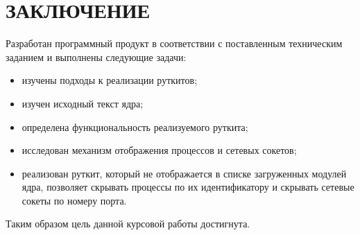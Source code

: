 \chapter*{\hfill{}ЗАКЛЮЧЕНИЕ\hfill{}}%
\label{cha:zakliuchenie}

Разработан программный продукт в соответствии с поставленным техническим заданием и выполнены следующие задачи:
\begin{itemize}
    \item
        изучены подходы к реализации руткитов;
    \item
        изучен исходный текст ядра;
    \item
        определена функциональность реализуемого руткита;
    \item
        исследован механизм отображения процессов и сетевых сокетов;
    \item
        реализован руткит, который не отображается в списке загруженных модулей ядра, позволяет скрывать процессы по их идентификатору и скрывать сетевые сокеты по номеру порта.
\end{itemize}

Таким образом цель данной курсовой работы достигнута.
